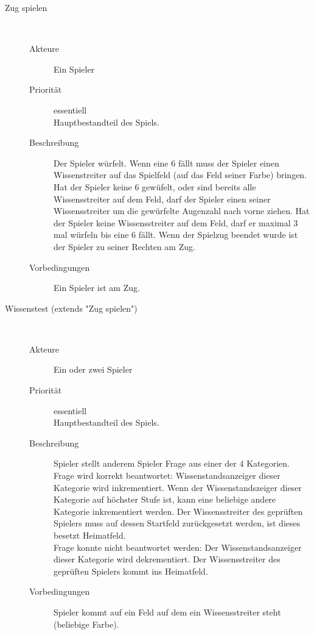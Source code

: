 \documentclass{scrartcl} %
\begin{document}
\begin{description}
   \item[Zug spielen]~\par
   \begin{description}
      \item[Akteure] Ein Spieler
      \item[Priorität] essentiell\\Hauptbestandteil des Spiels.
      \item[Beschreibung] Der Spieler würfelt. Wenn eine 6 fällt muss der Spieler einen Wissenstreiter auf das Spielfeld (auf das Feld seiner Farbe) bringen. Hat der Spieler keine 6 gewüfelt, oder sind bereits alle Wissensstreiter auf dem Feld, darf der Spieler einen seiner Wissensstreiter um die gewürfelte Augenzahl nach vorne ziehen. Hat der Spieler keine Wissensstreiter auf dem Feld, darf er maximal 3 mal würfeln bis eine 6 fällt. Wenn der Spielzug beendet wurde ist der Spieler zu seiner Rechten am Zug.
      \item[Vorbedingungen] Ein Spieler ist am Zug.
   \end{description}
   

   \item[Wissenstest (extends "Zug spielen")]~\par
   \begin{description}
      \item[Akteure] Ein oder zwei Spieler
      \item[Priorität] essentiell\\Hauptbestandteil des Spiels.
      \item[Beschreibung] Spieler stellt anderem Spieler Frage aus einer der 4 Kategorien.\\
Frage wird korrekt beantwortet: Wissenstandsanzeiger dieser Kategorie wird inkrementiert. Wenn der Wissenstandszeiger dieser Kategorie auf höchster Stufe ist, kann eine beliebige andere Kategorie inkrementiert werden. Der Wissensstreiter des geprüften Spielers muss auf dessen Startfeld zurückgesetzt werden, ist dieses besetzt Heimatfeld.\\
Frage konnte nicht beantwortet werden: Der Wissenstandsanzeiger dieser Kategorie wird dekrementiert. Der Wissensstreiter des geprüften Spielers kommt ins Heimatfeld.
      \item[Vorbedingungen] Spieler kommt auf ein Feld auf dem ein Wissensstreiter steht (beliebige Farbe).
   \end{description}



\end{description}
\end{document}
